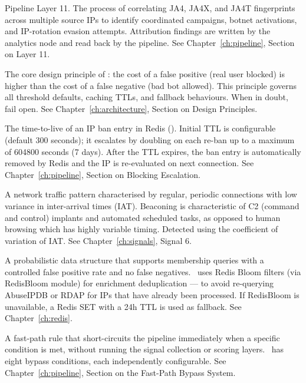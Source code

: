 \begin{description}[leftmargin=0pt, style=nextline, itemsep=8pt]
  \item[Attacker attribution\index{attacker attribution}]
  Pipeline Layer 11. The process of correlating JA4, JA4X, and JA4T fingerprints
  across multiple source IPs to identify coordinated campaigns, botnet activations,
  and IP-rotation evasion attempts. Attribution findings are written by the analytics
  node and read back by the pipeline.
  See Chapter~\ref{ch:pipeline}, Section on Layer 11.

  \item[Asymmetry principle\index{asymmetry principle}]
  The core design principle of \ja: the cost of a false positive (real user blocked)
  is higher than the cost of a false negative (bad bot allowed). This principle
  governs all threshold defaults, caching TTLs, and fallback behaviours. When in
  doubt, fail open.
  See Chapter~\ref{ch:architecture}, Section on Design Principles.

  \item[Ban TTL\index{ban TTL}]
  The time-to-live of an IP ban entry in Redis (). Initial TTL is
  configurable (default 300 seconds); it escalates by doubling on each re-ban up
  to a maximum of 604800 seconds (7 days). After the TTL expires, the ban entry is
  automatically removed by Redis and the IP is re-evaluated on next connection.
  See Chapter~\ref{ch:pipeline}, Section on Blocking Escalation.

  \item[Beaconing\index{beaconing}]
  A network traffic pattern characterised by regular, periodic connections with low
  variance in inter-arrival times (IAT). Beaconing is characteristic of C2 (command
  and control) implants and automated scheduled tasks, as opposed to human browsing
  which has highly variable timing. Detected using the coefficient of variation of
  IAT.
  See Chapter~\ref{ch:signals}, Signal 6.

  \item[Bloom filter\index{Bloom filter}]
  A probabilistic data structure that supports membership queries with a controlled
  false positive rate and no false negatives. \ja\ uses Redis Bloom filters (via
  RedisBloom module) for enrichment deduplication — to avoid re-querying AbuseIPDB
  or RDAP for IPs that have already been processed. If RedisBloom is unavailable,
  a Redis SET with a 24h TTL is used as fallback.
  See Chapter~\ref{ch:redis}.

  \item[Bypass condition\index{bypass condition}]
  A fast-path rule that short-circuits the pipeline immediately when a specific
  condition is met, without running the signal collection or scoring layers.
  \ja\ has eight bypass conditions, each independently configurable.
  See Chapter~\ref{ch:pipeline}, Section on the Fast-Path Bypass System.


\end{description}

